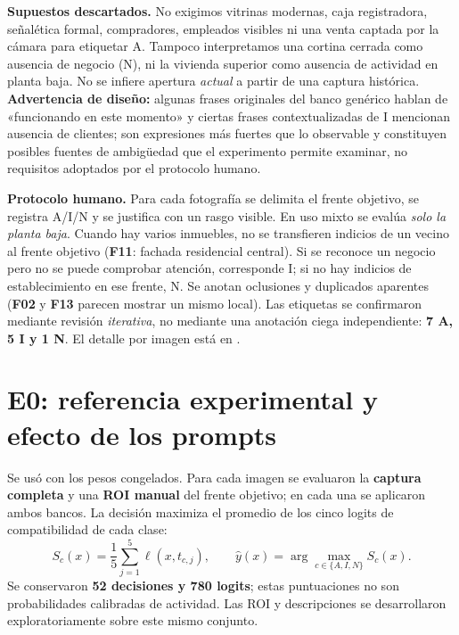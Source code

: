 \documentclass[10pt,a4paper]{article}
\newcommand{\fcase}[1]{\textbf{F#1}}
\begin{document}
\textbf{Supuestos descartados.} No exigimos vitrinas modernas, caja registradora, señalética formal, compradores, empleados visibles ni una venta captada por la cámara para etiquetar A. Tampoco interpretamos una cortina cerrada como ausencia de negocio (N), ni la vivienda superior como ausencia de actividad en planta baja. No se infiere apertura \emph{actual} a partir de una captura histórica. \textbf{Advertencia de diseño:} algunas frases originales del banco genérico hablan de «funcionando en este momento» y ciertas frases contextualizadas de I mencionan ausencia de clientes; son expresiones más fuertes que lo observable y constituyen posibles fuentes de ambigüedad que el experimento permite examinar, no requisitos adoptados por el protocolo humano.

\textbf{Protocolo humano.} Para cada fotografía se delimita el frente objetivo, se registra A/I/N y se justifica con un rasgo visible. En uso mixto se evalúa \emph{solo la planta baja}. Cuando hay varios inmuebles, no se transfieren indicios de un vecino al frente objetivo (\fcase{11}: fachada residencial central). Si se reconoce un negocio pero no se puede comprobar atención, corresponde I; si no hay indicios de establecimiento en ese frente, N. Se anotan oclusiones y duplicados aparentes (\fcase{02} y \fcase{13} parecen mostrar un mismo local). Las etiquetas se confirmaron mediante revisión \emph{iterativa}, no mediante una anotación ciega independiente: \textbf{7 A, 5 I y 1 N}. El detalle por imagen está en .

\newpage
\section{E0: referencia experimental y efecto de los prompts}

Se usó  con los pesos congelados. Para cada imagen se evaluaron la \textbf{captura completa} y una \textbf{ROI manual} del frente objetivo; en cada una se aplicaron ambos bancos. La decisión maximiza el promedio de los cinco logits de compatibilidad de cada clase:
\begin{equation}
S_c(x)=\frac{1}{5}\sum_{j=1}^{5}\ell(x,t_{c,j}), \qquad \widehat y(x)=\arg\max_{c\in\{A,I,N\}} S_c(x).
\end{equation}
Se conservaron \textbf{52 decisiones y 780 logits}; estas puntuaciones no son probabilidades calibradas de actividad. Las ROI y descripciones se desarrollaron exploratoriamente sobre este mismo conjunto.
\end{document}

